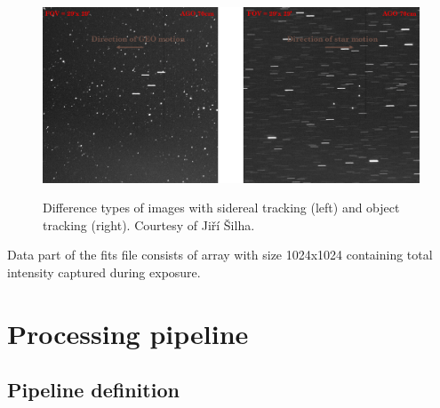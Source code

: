 \documentclass[12pt, a4paper, oneside]{book}
\begin{document}
\begin{figure}[!hbt]
    \begin{center}
        \includegraphics[scale=0.60]{images/tracking.png}
        \label{img:tracking types}
        \caption{Difference types of images with sidereal tracking (left) and object tracking (right). Courtesy of Jiří Šilha.}
    \end{center}
\end{figure}

Data part of the fits file consists of array with size 1024x1024 containing total intensity captured during exposure.

\chapter{Processing pipeline}

\section{Pipeline definition}
\end{document}
